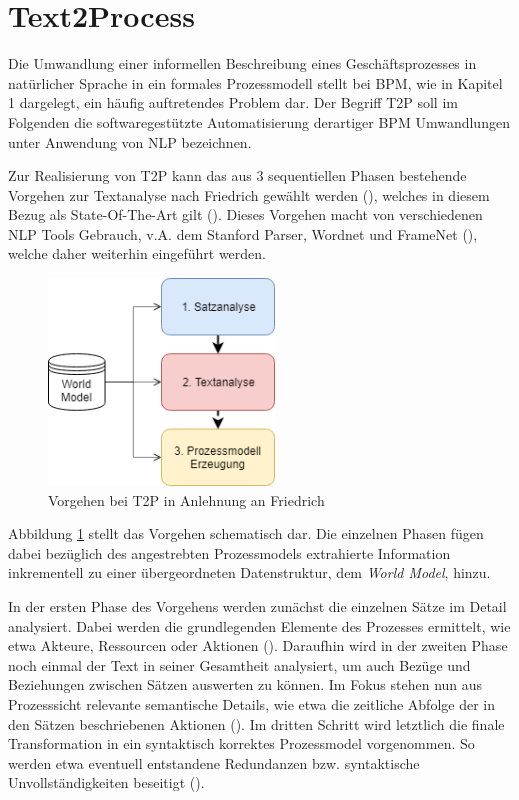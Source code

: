 \section{Text2Process}


Die Umwandlung einer informellen Beschreibung eines Geschäftsprozesses in na\-tür\-li\-cher Sprache in ein formales Prozessmodell stellt bei \ac{BPM}, wie in Kapitel 1 dargelegt, ein häufig auftretendes Problem dar. 
Der Begriff \ac{T2P} soll im Folgenden die softwaregestützte Automatisierung derartiger \ac{BPM} Umwandlungen unter Anwendung von \ac{NLP} bezeichnen.\par
Zur Realisierung von \ac{T2P} kann das aus 3 sequentiellen Phasen bestehende Vorgehen zur Textanalyse nach Friedrich gewählt werden (\cite[vgl.][4 ff.]{FRIEDRICH2}), welches in diesem Bezug als State-Of-The-Art gilt (\cite[vgl.][11]{RIEFER}). Dieses Vorgehen macht von verschiedenen \ac{NLP} Tools Gebrauch, v.A. dem Stanford Parser, Wordnet und FrameNet (\cite[vgl.][11]{RIEFER}), welche daher weiterhin eingeführt werden.
\begin{figure}
\includegraphics[width=6cm]{pictures/T2P_highlevel.png}
\caption{Vorgehen bei T2P in Anlehnung an Friedrich}
\label{fig:T2PHL}
\end{figure}
Abbildung \ref{fig:T2PHL} stellt das Vorgehen schematisch dar. Die einzelnen Phasen fügen dabei bezüglich des angestrebten Prozessmodels extrahierte Information inkrementell zu einer übergeordneten Datenstruktur, dem \textit{World Model}, hinzu.\par
In der ersten Phase des Vorgehens werden zunächst die einzelnen Sätze im Detail analysiert. Dabei werden die grundlegenden Elemente des Prozesses ermittelt, wie etwa Akteure, Ressourcen oder Aktionen (\cite[vgl.][47 ff.]{FRIEDRICH1}). Daraufhin wird in der zweiten Phase noch einmal der Text in seiner Gesamtheit analysiert, um auch Bezüge und Beziehungen zwischen Sätzen auswerten zu können. Im Fokus stehen nun aus Prozesssicht relevante semantische Details, wie etwa die zeitliche Abfolge der in den Sätzen beschriebenen Aktionen (\cite[vgl.][66 ff.]{FRIEDRICH1}). Im dritten Schritt wird letztlich die finale Transformation in ein syntaktisch korrektes Prozessmodel vorgenommen. So werden etwa  eventuell entstandene Redundanzen bzw. syntaktische Unvollständigkeiten beseitigt (\cite[vgl.][90 ff.]{FRIEDRICH1}).
